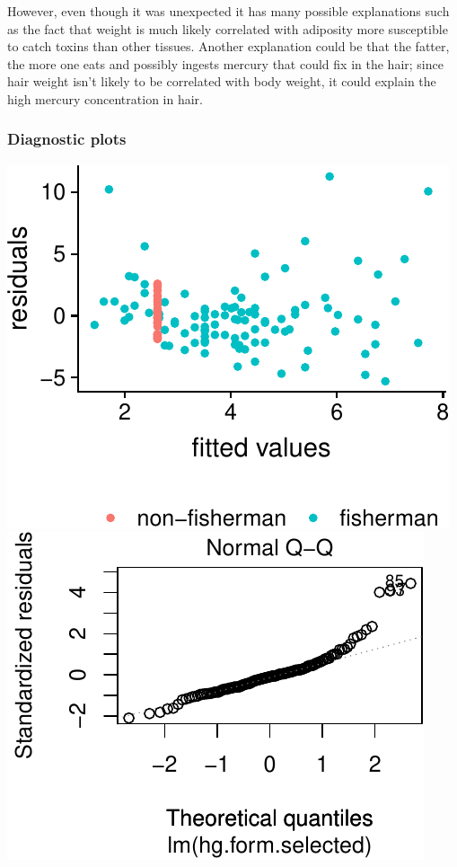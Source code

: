\documentclass[12pt,]{article}
\begin{document}
However, even though it was unexpected it has many possible explanations
such as the fact that weight is much likely correlated with adiposity
more susceptible to catch toxins than other tissues. Another explanation
could be that the fatter, the more one eats and possibly ingests mercury
that could fix in the hair; since hair weight isn't likely to be
correlated with body weight, it could explain the high mercury
concentration in hair.

\subsubsection{Diagnostic plots}\label{diagnostic-plots}

\includegraphics{Report_files/figure-latex/unnamed-chunk-18-1.pdf}
\includegraphics{Report_files/figure-latex/unnamed-chunk-18-2.pdf}
\end{document}
